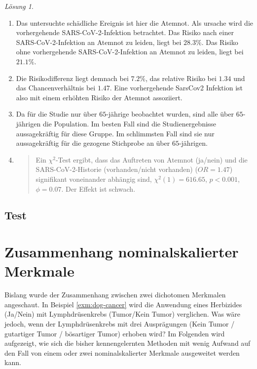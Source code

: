 \documentclass[
]{book}
\theoremstyle{definition}
\theoremstyle{definition}
\theoremstyle{definition}
\theoremstyle{definition}
\theoremstyle{remark}
\newtheorem*{solution}{Lösung}
\begin{document}
\begin{solution}
\begin{enumerate}
\def\labelenumi{\alph{enumi})}
\item
  Das untersuchte schädliche Ereignis ist hier die Atemnot. Als ursache wird die vorhergehende SARS-CoV-2-Infektion betrachtet. Das Risiko nach einer SARS-CoV-2-Infektion an Atemnot zu leiden, liegt bei \(28.3 \%\). Das Risiko ohne vorhergehende SARS-CoV-2-Infektion an Atemnot zu leiden, liegt bei \(21.1 \%.\)
\item
  Die Risikodifferenz liegt demnach bei \(7.2\%\), das relative Risiko bei \(1.34\) und das Chancenverhältnis bei \(1.47\). Eine vorhergehende SarsCov2 Infektion ist also mit einem erhöhten Risiko der Atemnot assoziiert.
\item
  Da für die Studie nur über \(65\)-jährige beobachtet wurden, sind alle über \(65\)-jährigen die Population. Im besten Fall sind die Studienergebnisse aussagekräftig für diese Gruppe. Im schlimmsten Fall sind sie nur aussagekräftig für die gezogene Stichprobe an über \(65\)-jährigen.
\item
  \begin{quote}
  Ein \(\chi^2\)-Test ergibt, dass das Auftreten von Atemnot (ja/nein) und die SARS-CoV-2-Historie (vorhanden/nicht vorhanden) (\(OR = 1.47\)) signifikant voneinander abhängig sind, \(\chi^2 (1) = 616.65\), \(p < 0.001\), \(\phi = 0.07.\) Der Effekt ist schwach.
  \end{quote}
\end{enumerate}

\end{solution}

\section{Test}\label{test-5}

\chapter{Zusammenhang nominalskalierter Merkmale}\label{zusammenhang-nominalskalierter-merkmale}

Bislang wurde der Zusammenhang zwischen zwei dichotomen Merkmalen angeschaut. In Beispiel \ref{exm:dog-cancer} wird die Anwendung eines Herbizides (Ja/Nein) mit Lymphdrüsenkrebs (Tumor/Kein Tumor) verglichen. Was wäre jedoch, wenn der Lymphdrüsenkrebs mit drei Ausprägungen (Kein Tumor / gutartiger Tumor / bösartiger Tumor) erhoben wird? Im Folgenden wird aufgezeigt, wie sich die bisher kennengelernten Methoden mit wenig Aufwand auf den Fall von einem oder zwei nominalskalierter Merkmale ausgeweitet werden kann.
\end{document}
